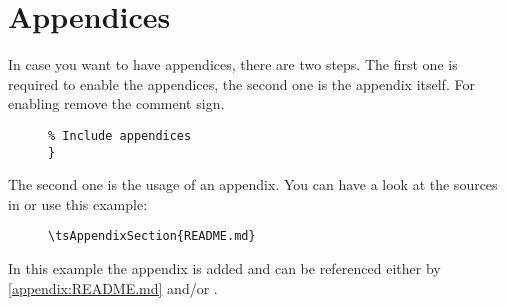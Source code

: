 \section{Appendices}

In case you want to have appendices, there are two steps. The first one is
required to enable the appendices, the second one is the appendix itself.
For enabling remove the comment sign.

\begin{figure}[H]
    \small
    \centering
    \begin{BVerbatim}
}
    \end{BVerbatim}
\end{figure}

The second one is the usage of an appendix. You can have a look at the sources
in  or use this example:

\begin{figure}[H]
    \small
    \centering
    \begin{BVerbatim}
\tsAppendixSection{README.md}
    \end{BVerbatim}
\end{figure}

In this example the appendix  is added and can be
referenced either by \ref{appendix:README.md} and/or .
